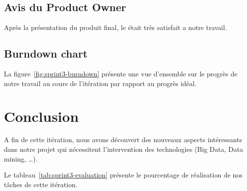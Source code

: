 \subsection{Avis du Product Owner}

Après la présentation du produit final, le  était très
satisfait a notre travail.

\subsection{Burndown chart}

La figure~\ref{fig:sprint3-burndown} présente une vue d'ensemble sur le progrès
de notre travail au cours de l'itération par rapport au progrès idéal.



\section*{Conclusion}

A fin de cette itération, nous avons découvert des nouveaux aspects
intéressants dans notre projet qui nécessitent l'intervention des technologies
(Big Data, Data mining, \ldots).

Le tableau~\ref{tab:sprint3-evaluation} présente le pourcentage de réalisation
de nos tâches de cette itération.

